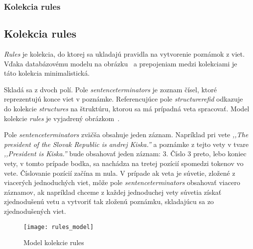 %
%
{
	\subsubsection{Kolekcia rules}
}
{
	\subsection{Kolekcia rules}
}
\label{subsubsection:collection_rules}
\textit{Rules} je kolekcia, do ktorej sa ukladajú pravidla na vytvorenie poznámok z viet. Vďaka databázovému modelu na obrázku~ a prepojeniam medzi kolekciami je táto kolekcia minimalistická.

Skladá sa z dvoch polí. Pole \textit{sentence\textunderscore terminators} je zoznam čísel, ktoré reprezentujú konce viet v poznámke. Referencujúce pole \textit{structure\textunderscore ref\textunderscore id} odkazuje do kolekcie \textit{structures} na štruktúru, ktorou sa má prípadná veta spracovať. Model kolekcie \textit{rules} je vyjadrený obrázkom~.

Pole \textit{sentence\textunderscore terminators} zväčša obsahuje jeden záznam. Napríklad pri vete \textit{,,The president of the Slovak Republic is andrej Kiska.''} a poznámke z tejto vety v tvare \textit{,,President is Kiska.''} bude obsahovať jeden záznam: 3. Číslo 3 preto, lebo koniec vety, v tomto prípade bodka, sa nachádza na tretej pozícií spomedzi tokenov vo vete. Číslovanie pozícií začína  m nula. V prípade ak veta je súvetie, zložené z viacerých jednoduchých viet, môže pole \textit{sentence\textunderscore terminators} obsahovať viacero záznamov, ak napríklad chceme z každej jednoduchej vety súvetia získať zjednodušenú vetu a vytvoriť tak zloženú poznámku, skladajúcu sa zo zjednodušených viet.

\begin{figure}[H]
	\begin{center}\texttt{[image: rules\_model]}\end{center}
	\caption[Model kolekcie rules]{Model kolekcie rules}\label{fig:rules_collection_model}
\end{figure}

